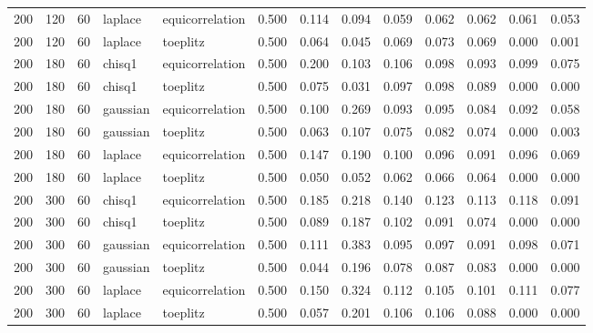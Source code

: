 \begin{tabular}{rrrllrrrrrrrr}
200 & 120 & 60 & laplace & equicorrelation & 0.500 & 0.114 & 0.094 & 0.059 & 0.062 & 0.062 & 0.061 & 0.053 \\
200 & 120 & 60 & laplace & toeplitz & 0.500 & 0.064 & 0.045 & 0.069 & 0.073 & 0.069 & 0.000 & 0.001 \\
200 & 180 & 60 & chisq1 & equicorrelation & 0.500 & 0.200 & 0.103 & 0.106 & 0.098 & 0.093 & 0.099 & 0.075 \\
200 & 180 & 60 & chisq1 & toeplitz & 0.500 & 0.075 & 0.031 & 0.097 & 0.098 & 0.089 & 0.000 & 0.000 \\
200 & 180 & 60 & gaussian & equicorrelation & 0.500 & 0.100 & 0.269 & 0.093 & 0.095 & 0.084 & 0.092 & 0.058 \\
200 & 180 & 60 & gaussian & toeplitz & 0.500 & 0.063 & 0.107 & 0.075 & 0.082 & 0.074 & 0.000 & 0.003 \\
200 & 180 & 60 & laplace & equicorrelation & 0.500 & 0.147 & 0.190 & 0.100 & 0.096 & 0.091 & 0.096 & 0.069 \\
200 & 180 & 60 & laplace & toeplitz & 0.500 & 0.050 & 0.052 & 0.062 & 0.066 & 0.064 & 0.000 & 0.000 \\
200 & 300 & 60 & chisq1 & equicorrelation & 0.500 & 0.185 & 0.218 & 0.140 & 0.123 & 0.113 & 0.118 & 0.091 \\
200 & 300 & 60 & chisq1 & toeplitz & 0.500 & 0.089 & 0.187 & 0.102 & 0.091 & 0.074 & 0.000 & 0.000 \\
200 & 300 & 60 & gaussian & equicorrelation & 0.500 & 0.111 & 0.383 & 0.095 & 0.097 & 0.091 & 0.098 & 0.071 \\
200 & 300 & 60 & gaussian & toeplitz & 0.500 & 0.044 & 0.196 & 0.078 & 0.087 & 0.083 & 0.000 & 0.000 \\
200 & 300 & 60 & laplace & equicorrelation & 0.500 & 0.150 & 0.324 & 0.112 & 0.105 & 0.101 & 0.111 & 0.077 \\
200 & 300 & 60 & laplace & toeplitz & 0.500 & 0.057 & 0.201 & 0.106 & 0.106 & 0.088 & 0.000 & 0.000 \\
\bottomrule
\end{tabular}
